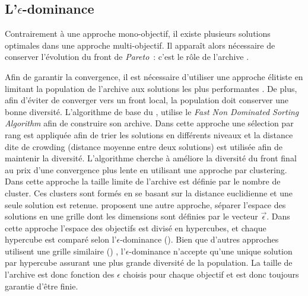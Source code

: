 \subsection[L’epsilon-dominance]{L’$\epsilon$-dominance} %
\label{sub:l_epsilon_dominance}
Contrairement à une approche mono-objectif, il existe plusieurs solutions optimales
dans une approche multi-objectif. Il apparaît alors nécessaire de conserver l’évolution
du front de \textit{Pareto}~: c’est le rôle de l’archive \parencite{Laumanns2002263}.

Afin de garantir la convergence, il est nécessaire d’utiliser une approche élitiste
en limitant la population de l’archive aux solutions les plus performantes \parencite{Zitzler2000173}.
De plus, afin d’éviter de converger vers un front local, la population doit conserver
une bonne diversité.
L’algorithme de base du  \parencite{Deb2002182}, utilise le \textit{Fast
Non Dominated Sorting Algorithm} afin de construire son archive. Dans cette approche une
sélection par rang est appliquée afin de trier les solutions en différents niveaux et la
distance dite de crowding (distance moyenne entre deux solutions) est utilisée afin de
maintenir la diversité. L’algorithme  cherche à améliore la diversité du
front final au prix d’une convergence plus lente en utilisant une approche par clustering.
Dans cette approche la taille limite de l’archive est définie par le nombre de cluster.
Ces clusters sont formés en se basant sur la distance euclidienne et une seule solution
est retenue.
\textcite{Laumanns2002263} proposent une autre approche, séparer l’espace des solutions en une
grille dont les dimensions sont définies par le vecteur $\vec{\epsilon}$. Dans cette
approche l’espace des objectifs est divisé en hypercubes, et chaque hypercube est comparé
selon l’$\epsilon$-dominance (). Bien que d’autres
approches utilisent une grille similaire () \parencite{Knowles2000149},
l’$\epsilon$-dominance n’accepte qu’une unique solution par hypercube assurant une plus
grande diversité de la population. La taille de l’archive est donc fonction des $\epsilon$
choisis pour chaque objectif et est donc toujours garantie d’être finie.


